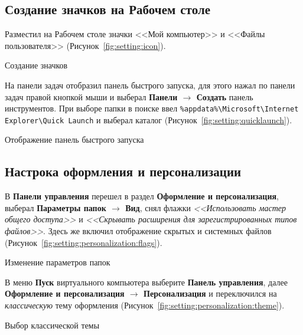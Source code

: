 \subsection{Создание значков на Рабочем столе}

Разместил на Рабочем столе значки <<Мой компьютер>> и <<Файлы пользователя>>
(Рисунок~\ref{fig:setting:icon}).

\begin{image}
	\caption{Создание значков}
	\label{fig:setting:icon}
\end{image}

На панели задач отобразил панель быстрого запуска,
для этого нажал по панели задач правой кнопкой мыши
и выберал \textbf{Панели $\rightarrow$ Создать} панель инструментов.
При выборе папки в поиске ввел
\verb|%appdata%\Microsoft\Internet Explorer\Quick Launch|
и выберал каталог (Рисунок~\ref{fig:setting:quicklaunch}).

\begin{image}
	\caption{Отображение панель быстрого запуска}
	\label{fig:setting:quicklaunch}
\end{image}

\subsection{Настрока оформления и персонализации}

В \textbf{Панели управления} перешел в раздел
\textbf{Оформление и персонализация}, выберал
\textbf{Параметры папок $\rightarrow$ Вид},
снял флажки \textit{<<Использовать мастер общего доступа>>} и
\textit{<<Скрывать расширения для зарегистрированных типов файлов>>}.
Здесь же включил отображение скрытых и системных файлов
(Рисунок~\ref{fig:setting:personalization:flags}).

\begin{image}
	\caption{Изменение параметров папок}
	\label{fig:setting:personalization:flags}
\end{image}

В меню \textbf{Пуск} виртуального компьютера выберите
\textbf{Панель управления}, далее
\textbf{Оформление и персонализация $\rightarrow$ Персонализация}
и переключился на \textit{классическую} тему оформления
(Рисунок~\ref{fig:setting:personalization:theme}).

\begin{image}
	\caption{Выбор классической темы}
	\label{fig:setting:personalization:theme}
\end{image}

